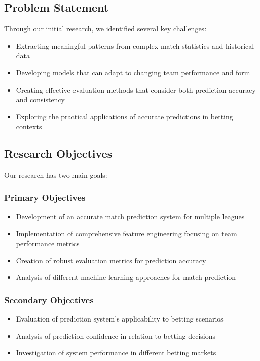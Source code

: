 \documentclass[conference]{IEEEtran}
\begin{document}
\subsection{Problem Statement}
Through our initial research, we identified several key challenges:
\begin{itemize}
\item Extracting meaningful patterns from complex match statistics and historical data
\item Developing models that can adapt to changing team performance and form
\item Creating effective evaluation methods that consider both prediction accuracy and consistency
\item Exploring the practical applications of accurate predictions in betting contexts
\end{itemize}

\subsection{Research Objectives}
Our research has two main goals:

\subsubsection{Primary Objectives}
\begin{itemize}
\item Development of an accurate match prediction system for multiple leagues
\item Implementation of comprehensive feature engineering focusing on team performance metrics
\item Creation of robust evaluation metrics for prediction accuracy
\item Analysis of different machine learning approaches for match prediction
\end{itemize}

\subsubsection{Secondary Objectives}
\begin{itemize}
\item Evaluation of prediction system's applicability to betting scenarios
\item Analysis of prediction confidence in relation to betting decisions
\item Investigation of system performance in different betting markets
\end{itemize}
\end{document}
